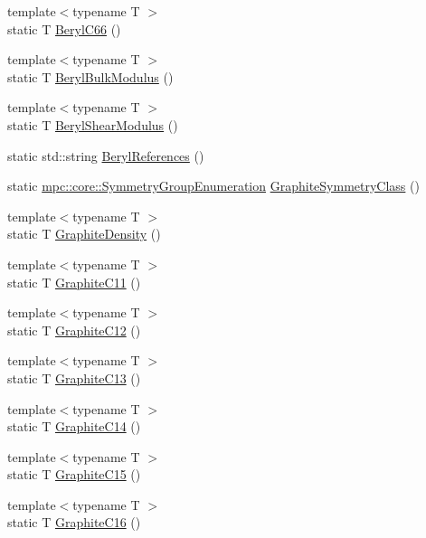 \begin{DoxyCompactItemize}
\item 
{\footnotesize template$<$typename T $>$ }\\static T \mbox{\hyperlink{namespacempc_1_1data_a229a68e56f887a1d88b0bcddee613a0b}{Beryl\+C66}} ()
\item 
{\footnotesize template$<$typename T $>$ }\\static T \mbox{\hyperlink{namespacempc_1_1data_a361eb2d7e1040aba96b8bfa197f3a1e0}{Beryl\+Bulk\+Modulus}} ()
\item 
{\footnotesize template$<$typename T $>$ }\\static T \mbox{\hyperlink{namespacempc_1_1data_a30ababb5af7a05ca85d1f618db65e9c9}{Beryl\+Shear\+Modulus}} ()
\item 
static std\+::string \mbox{\hyperlink{namespacempc_1_1data_ad766b9fe706721bb870ddd9d38448fc5}{Beryl\+References}} ()
\item 
static \mbox{\hyperlink{namespacempc_1_1core_a9d979684062547055a0ef5c13077bad8}{mpc\+::core\+::\+Symmetry\+Group\+Enumeration}} \mbox{\hyperlink{namespacempc_1_1data_a0ffa3bb4287e170653682a58ac21b455}{Graphite\+Symmetry\+Class}} ()
\item 
{\footnotesize template$<$typename T $>$ }\\static T \mbox{\hyperlink{namespacempc_1_1data_ac449d0b5afb00453a45d66d9acdffc93}{Graphite\+Density}} ()
\item 
{\footnotesize template$<$typename T $>$ }\\static T \mbox{\hyperlink{namespacempc_1_1data_a81cbaf579766460ce33ed545dedd8f97}{Graphite\+C11}} ()
\item 
{\footnotesize template$<$typename T $>$ }\\static T \mbox{\hyperlink{namespacempc_1_1data_a68fccf70e7512250766f422d5fc9c567}{Graphite\+C12}} ()
\item 
{\footnotesize template$<$typename T $>$ }\\static T \mbox{\hyperlink{namespacempc_1_1data_a17e2bef640bc383044ccaab834f00032}{Graphite\+C13}} ()
\item 
{\footnotesize template$<$typename T $>$ }\\static T \mbox{\hyperlink{namespacempc_1_1data_ac7e0ec47ff13536fcd4a0ff3e8ed5a74}{Graphite\+C14}} ()
\item 
{\footnotesize template$<$typename T $>$ }\\static T \mbox{\hyperlink{namespacempc_1_1data_a7d8d8923cd6ddca415da2911dd6d519e}{Graphite\+C15}} ()
\item 
{\footnotesize template$<$typename T $>$ }\\static T \mbox{\hyperlink{namespacempc_1_1data_ac743d41f62cbd74047f13192ce87c307}{Graphite\+C16}} ()

\end{DoxyCompactItemize}
